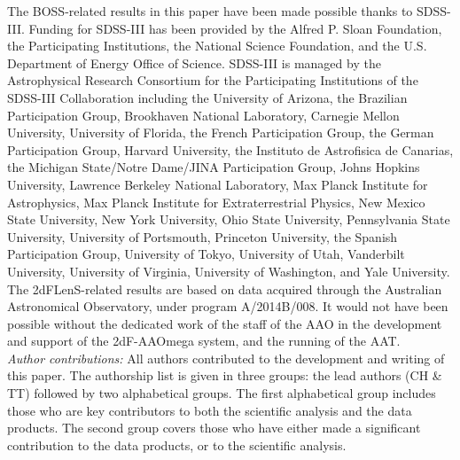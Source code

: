 \documentclass{aa}
\begin{document}
\begin{acknowledgements}
The BOSS-related results in this paper have been made possible thanks to SDSS-III. Funding for SDSS-III has been provided by the Alfred P. Sloan Foundation, the Participating Institutions, the National Science Foundation, and the U.S. Department of Energy Office of Science.   SDSS-III is managed by the Astrophysical Research Consortium for the Participating Institutions of the SDSS-III Collaboration including the University of Arizona, the Brazilian Participation Group, Brookhaven National Laboratory, Carnegie Mellon University, University of Florida, the French Participation Group, the German Participation Group, Harvard University, the Instituto de Astrofisica de Canarias, the Michigan State/Notre Dame/JINA Participation Group, Johns Hopkins University, Lawrence Berkeley National Laboratory, Max Planck Institute for Astrophysics, Max Planck Institute for Extraterrestrial Physics, New Mexico State University, New York University, Ohio State University, Pennsylvania State University, University of Portsmouth, Princeton University, the Spanish Participation Group, University of Tokyo, University of Utah, Vanderbilt University, University of Virginia, University of Washington, and Yale University.\\

The 2dFLenS-related results are based on data acquired through the Australian Astronomical Observatory, under program A/2014B/008. It would not have been possible without the dedicated work of the staff of the AAO in the development and support of the 2dF-AAOmega system, and the running of the AAT.\\

{ {\it Author contributions:}  All authors contributed to the development and writing of this paper.  The authorship list is given in three groups:  the lead authors (CH \& TT) followed by two alphabetical groups.  The first alphabetical group includes those who are key contributors to both the scientific analysis and the data products.  The second group covers those who have either made a significant contribution to the data products, or to the scientific analysis.}
\end{acknowledgements}






\end{document}
